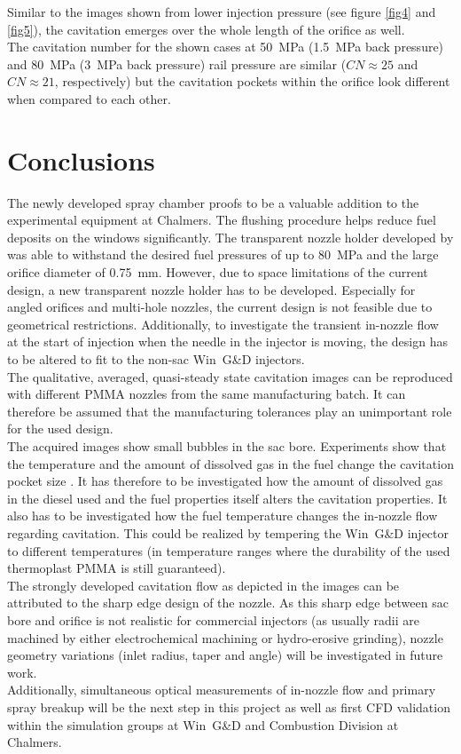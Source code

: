 \documentclass[letterpaper,twocolumn,10pt]{ilass}
\begin{document}
Similar to the images shown from lower injection pressure (see figure \ref{fig4} and \ref{fig5}),
the cavitation emerges over the whole length of the orifice as well.\\
%
The cavitation number for the shown cases at 50~MPa (1.5~MPa back pressure) and 80~MPa
(3~MPa back pressure) rail pressure are similar ($CN \approx 25$ and $CN \approx 21$,
respectively) but the cavitation pockets within the orifice look different when compared
to each other.\\


\section*{Conclusions}
The newly developed spray chamber proofs to be a valuable addition to the experimental equipment
at Chalmers. The flushing procedure helps reduce fuel deposits on the windows significantly.
The transparent nozzle holder developed by \cite{Falgout2015} was able to withstand the desired
fuel pressures of up to 80~MPa and the large orifice diameter of 0.75~mm. However, due to space
limitations of the current design, a new transparent nozzle holder has to be developed.
Especially for angled orifices and multi-hole nozzles, the current design is not feasible due
to geometrical restrictions. Additionally, to investigate the transient in-nozzle flow at the
start of injection when the needle in the injector is moving, the design has to be altered to
fit to the non-sac Win~G\&D injectors.\\
%
The qualitative, averaged, quasi-steady state cavitation images can be reproduced with different
PMMA nozzles from the same manufacturing batch. It can therefore be assumed that the
manufacturing tolerances play an unimportant role for the used design.\\
%
The acquired images show small bubbles in the sac bore. Experiments show that the temperature
and the amount of dissolved gas in the fuel change the cavitation pocket size
\cite{Watanabe2014}.
It has therefore to be investigated how the amount of dissolved gas in the diesel used and
the fuel properties itself alters the cavitation properties. It also has to be investigated
how the fuel temperature changes the in-nozzle flow regarding cavitation. This could be realized
by tempering the Win~G\&D injector to different temperatures (in temperature ranges where the
durability of the used thermoplast PMMA is still guaranteed).\\
%
The strongly developed cavitation flow as depicted in the images can be attributed to the
sharp edge design of the nozzle. As this sharp edge between sac bore and orifice is not
realistic for commercial injectors (as usually radii are machined by either electrochemical
machining or hydro-erosive grinding), nozzle geometry variations (inlet radius, taper and angle)
will be investigated in future work.\\
%
Additionally, simultaneous optical measurements of in-nozzle flow and primary spray breakup
will be the next step in this project as well as first CFD validation within the simulation
groups at Win~G\&D and Combustion Division at Chalmers.\\
%
\end{document}
